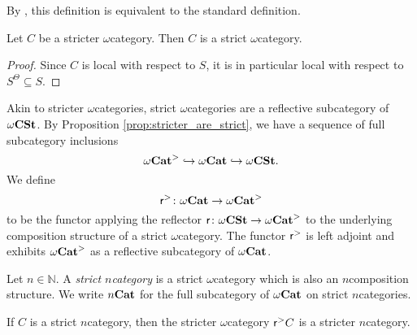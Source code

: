\begin{rmk}
    By \cite[Theorem 1.12]{berger2002cellular}, this definition is equivalent to the standard definition.
\end{rmk}

\begin{prop} \label{prop:stricter_are_strict}
    Let \( C \) be a stricter \( \omega \)\nbd category.
    Then \( C \) is a strict \( \omega \)\nbd category.
\end{prop}
\begin{proof}
    Since \( C \) is local with respect to \( S \), it is in particular local with respect to \( S^\Theta \subseteq S \).
\end{proof} 

\noindent Akin to stricter \( \omega \)\nbd categories, strict \( \omega \)\nbd categories are a reflective subcategory of \( \omega\mathbf{CSt} \).
By Proposition \ref{prop:stricter_are_strict}, we have a sequence of full subcategory inclusions
\begin{equation*}
     {\omega\mathbf{Cat}}^> \hookrightarrow {\omega\mathbf{Cat}} \hookrightarrow \omega\mathbf{CSt}.
\end{equation*}
We define
\begin{equation*}
    \mathsf{r}^{>} \colon {\omega\mathbf{Cat}} \to {\omega\mathbf{Cat}}^>
\end{equation*}
to be the functor applying the reflector \( \mathsf{r} \colon \omega\mathbf{CSt} \to {\omega\mathbf{Cat}}^>  \) to the underlying composition structure of a strict \( \omega \)\nbd category.
The functor \( \mathsf{r}^{>} \) is left adjoint and exhibits \( {\omega\mathbf{Cat}}^> \) as a reflective subcategory of \( {\omega\mathbf{Cat}} \).

\begin{dfn} 
    Let \( n \in \mathbb{N} \).
    A \emph{strict \( n \)\nbd category} is a strict \( \omega \)\nbd category which is also an \( n \)\nbd composition structure.
    We write \( {n\mathbf{Cat}} \) for the full subcategory of \( {\omega\mathbf{Cat}} \) on strict \( n \)\nbd categories.
\end{dfn}

\begin{rmk}
    If \( C \) is a strict \( n \)\nbd category, then the stricter \( \omega \)\nbd category \( \mathsf{r}^{>} C \) is a stricter \( n \)\nbd category.
\end{rmk}


